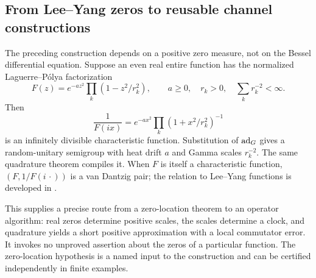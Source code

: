 \subsection{From Lee--Yang zeros to reusable channel constructions}

The preceding construction depends on a positive zero measure, not on the
Bessel differential equation. Suppose an even real entire function has
the normalized Laguerre--P\'olya factorization
\[
 F(z)=e^{-az^2}\prod_k(1-z^2/r_k^2),\qquad
 a\ge0,\quad r_k>0,\quad\sum_kr_k^{-2}<\infty.
\]
Then
\[
 \frac1{F(ix)}=e^{-ax^2}\prod_k(1+x^2/r_k^2)^{-1}
\]
is an infinitely divisible characteristic function. Substitution of
$\operatorname{ad}_G$ gives a random-unitary semigroup with heat drift $a$ and Gamma
scales $r_k^{-2}$. The same quadrature theorem compiles it. When $F$ is
itself a characteristic function, $(F,1/F(i\,\cdot))$ is a van Dantzig
pair; the relation to Lee--Yang functions is developed in
\citet{KonstantopoulosPatieSarkar2024}.

This supplies a precise route from a zero-location theorem to an operator
algorithm: real zeros determine positive scales, the scales determine a
clock, and quadrature yields a short positive approximation with a local
commutator error. It invokes no unproved assertion about the zeros of a
particular function. The zero-location hypothesis is a named input to the
construction and can be certified independently in finite examples.

